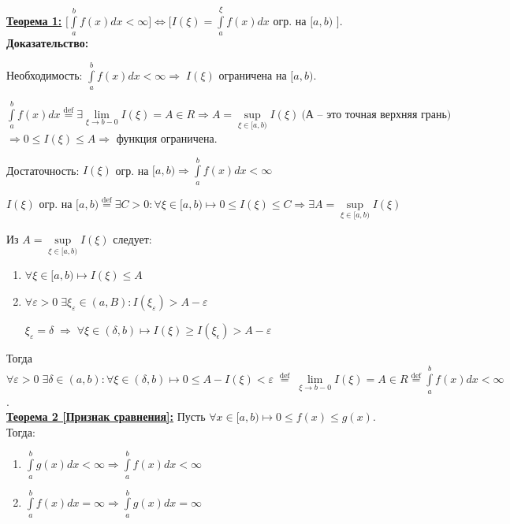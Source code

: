 \documentclass[a4paper,12pt]{article} %
\newcommand{\eqdef}{\stackrel{\mathrm{def}}{=}}
\renewcommand {\geq}{\geqslant}
\renewcommand {\leq}{\leqslant}
\begin{document}
\underline{\textbf{Теорема 1:}} $\bigl[ \int\limits_a^{b} f(x) dx <\infty \bigr] \Leftrightarrow \bigl[ I(\xi) = \int\limits_a^{\xi} f(x) dx$ \;огр.\; на\; $[a, b)$ $\bigr]$.\\

\textbf{Доказательство:} 

Необходимость: $\int\limits_a^{b} f(x) dx < \infty \Rightarrow\; I(\xi)$ ограничена на $[a, b)$.

$\int\limits_a^{b} f(x) dx \stackrel{\text{def}}{=} \exists \lim\limits_{\xi \rightarrow b-0}I(\xi) = A \in R \Rightarrow A = \sup\limits_{\xi \in[a,b)} I(\xi) ~ \text{(А -- это точная верхняя грань)} $ $\Rightarrow 0 \leq I(\xi) \leq A \Rightarrow$ функция ограничена.

Достаточность: $I(\xi)$  огр. на $[a, b) \Rightarrow \int\limits_a^{b} f(x) dx < \infty$

$I(\xi)$ огр. на $[a, b) \stackrel{\text{def}}{=} \exists C>0 : \forall \xi \in[a, b) \longmapsto 0 \leq I(\xi) \leq C \Rightarrow \exists A = \sup\limits_{\xi \in [a,b)}I(\xi)$

Из $A = \sup\limits_{\xi \in[a,b)} I(\xi)$ следует:

\begin{enumerate}
    \item $\forall \xi \in [a, b) \mapsto I(\xi) \leq A$
    
    \item $\forall \varepsilon > 0\; \exists \xi_\varepsilon \in (a, B) : I(\xi_\varepsilon)>A-\varepsilon$
    
    $\xi_\varepsilon = \delta \; \Rightarrow \; \forall \xi \in(\delta, b) \longmapsto I(\xi) \geq I(\xi_\epsilon)> A-\varepsilon$
\end{enumerate}

Тогда $\forall \varepsilon > 0 \; \exists\delta\in(a, b): \forall \xi \in(\delta, b) \longmapsto 0\leq A-I(\xi) < \varepsilon \; \stackrel{\text{def}}{=}\; \lim\limits_{\xi \rightarrow b-0} I(\xi) = A \in R \eqdef \int\limits_a^{b} f(x) dx < \infty$.\\

\underline{\textbf{Теорема 2 [Признак сравнения]:}} Пусть $\forall x \in [a, b) \longmapsto 0\leq f(x) \leq g(x)$. Тогда:

\begin{enumerate}
    \item $\int\limits_a^{b} g(x) dx < \infty \Rightarrow \int\limits_a^{b} f(x) dx < \infty$
    
    \item $\int\limits_a^{b} f(x) dx = \infty \Rightarrow \int\limits_a^{b} g(x) dx = \infty$
\end{enumerate}
\end{document}
